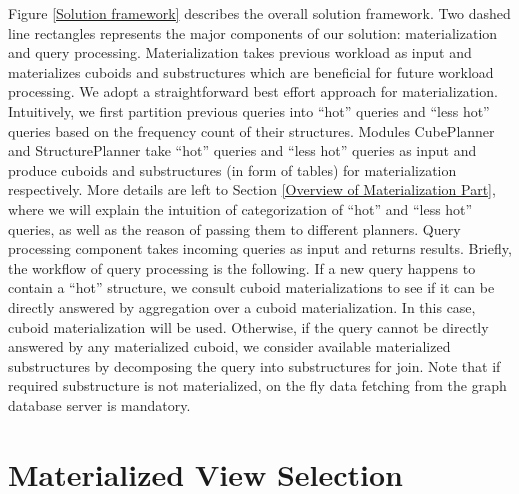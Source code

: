 Figure \ref{Solution framework} describes the overall solution framework. Two dashed line rectangles represents the major components of our solution: materialization and query processing. Materialization takes previous workload as input and materializes cuboids and substructures which are beneficial for future workload processing. We adopt a straightforward best effort approach for materialization. Intuitively, we first partition previous queries into ``hot'' queries and ``less hot'' queries based on the frequency count of their structures. Modules CubePlanner and StructurePlanner take ``hot'' queries and ``less hot'' queries as input and produce cuboids and substructures (in form of tables) for materialization respectively. More details are left to Section \ref{Overview of Materialization Part}, where we will explain the intuition of categorization of ``hot'' and ``less hot'' queries, as well as the reason of passing them to different planners.  Query processing component takes incoming queries as input and returns results. Briefly, the workflow of query processing is the following. If a new query happens to contain a ``hot'' structure, we consult cuboid materializations to see if it can be directly answered by aggregation over a cuboid materialization. In this case, cuboid materialization will be used. Otherwise, if the query cannot be directly answered by any materialized cuboid, we consider available materialized substructures by decomposing the query into substructures for join. Note that if required substructure is not materialized, on the fly data fetching from the graph database server is mandatory. %





\section{Materialized View Selection}
\label{Materialization Part}


